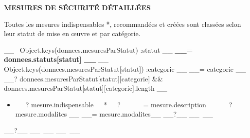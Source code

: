 \documentclass[9pt, a4paper]{article}
\begin{document}
  \pagestyle{fancy}
  \textbf{MESURES DE SÉCURITÉ DÉTAILLÉES}

  \textcolor{gris}{Toutes les mesures indispensables *, recommandées et créées sont classées selon
  leur statut de mise en œuvre et par catégorie.}

  \vskip 0.5cm
  __~ Object.keys(donnees.mesuresParStatut) :statut __
    \pagebreak[3]\textbf{__= donnees.statuts[statut] __}
    __~ Object.keys(donnees.mesuresParStatut[statut]) :categorie __
    \nopagebreak[1]\textcolor{bleu}{__= categorie __}
      __? donnees.mesuresParStatut[statut][categorie] &&
      donnees.mesuresParStatut[statut][categorie].length __
        \nopagebreak[4]\begin{itemize}
          __~ donnees.mesuresParStatut[statut][categorie] :mesure __%
          \nopagebreak[3]\item __? mesure.indispensable__*__?__ __= mesure.description__
              __? mesure.modalites __%
                \textcolor{gris}{__= mesure.modalites__}
              __?__%
          __~__%
        \end{itemize}
      __?__
    __~__
    \vskip 1cm
  __~__
  \vskip 1cm
\end{document}
